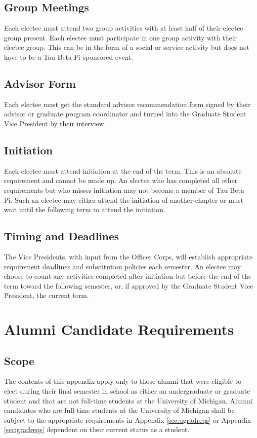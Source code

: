 \section{Group Meetings}
\label{grad_group_meetings} Each electee must attend two group activities with at least half of their electee group present.
Each electee must participate in one group activity with their electee group. 
This can be in the form of a social or service activity but does not have to be a Tau Beta Pi sponsored event.
\section{Advisor Form}
Each electee must get the standard advisor recommendation
form signed by their advisor or graduate program coordinator and turned into the
Graduate Student Vice President by their interview.

\section{Initiation}
Each electee must attend initiation at the end of the term. This
is an absolute requirement and cannot be made up. An electee who has completed all other
requirements but who misses initiation may not become a member of Tau Beta Pi. Such an
electee may either attend the initiation of another chapter or must wait until the following
term to attend the initiation.
\section{Timing and Deadlines}
The Vice Presidents, with input from the Officer Corps, will establish appropriate requirement deadlines and substitution policies each semester. 
An electee may choose to count any activities completed after initiation but before the end of the term toward the following semester, or, 
if approved by the Graduate Student Vice President, the current term.

\chapter{Alumni Candidate Requirements}\label{sec:alumnireqs}
\section{Scope}
The contents of this appendix apply only to those alumni that were eligible to elect during their final semester in school as either an undergraduate or graduate student and that are not full-time students at the University of Michigan.
Alumni candidates who are full-time students at the University of Michigan shall be subject to the appropriate requirements in Appendix \ref{sec:ugradreqs} or Appendix \ref{sec:gradreqs} dependent on their current status as a student.

